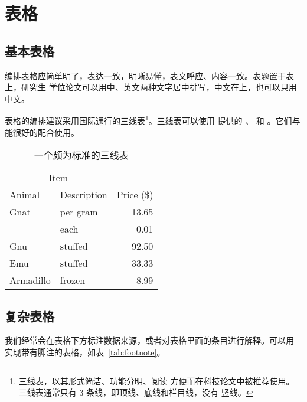 \section{表格}

\subsection{基本表格}

编排表格应简单明了，表达一致，明晰易懂，表文呼应、内容一致。表题置于表上，研究生
学位论文可以用中、英文两种文字居中排写，中文在上，也可以只用中文。

表格的编排建议采用国际通行的三线表\footnote{三线表，以其形式简洁、功能分明、阅读
方便而在科技论文中被推荐使用。三线表通常只有 3 条线，即顶线、底线和栏目线，没有
竖线。}。三线表可以使用  提供的 、 和
。它们与  能很好的配合使用。

\begin{table}[!hpt]
  \caption[一个颇为标准的三线表]{一个颇为标准的三线表\footnotemark}
  \label{tab:firstone}
  \centering
  \begin{tabular}{@{}llr@{}} \toprule
    \multicolumn{2}{c}{Item} \\ \cmidrule(r){1-2}
    Animal & Description & Price (\$)\\ \midrule
    Gnat  & per gram  & 13.65 \\
          & each      & 0.01 \\
    Gnu   & stuffed   & 92.50 \\
    Emu   & stuffed   & 33.33 \\
    Armadillo & frozen & 8.99 \\ \bottomrule
  \end{tabular}
\end{table}

\subsection{复杂表格}

我们经常会在表格下方标注数据来源，或者对表格里面的条目进行解释。可以用
 实现带有脚注的表格，如表~\ref{tab:footnote}。

